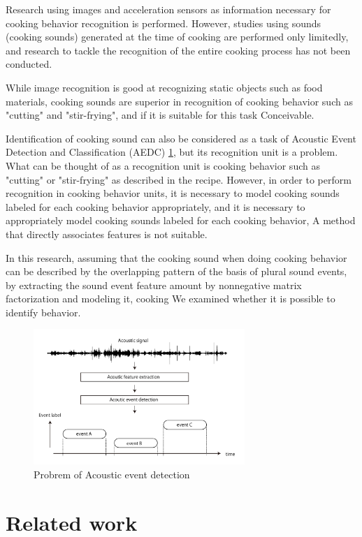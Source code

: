 \documentclass[sigchi]{acmart}
\begin{document}
Research using images and acceleration sensors as information necessary for cooking behavior recognition is performed\cite{Torre2008}\cite{Shimada2013}\cite{Kuehne2014}.
However, studies using sounds (cooking sounds) generated at the time of cooking are performed only limitedly\cite{Kojima2016}, and research to tackle the recognition of the entire cooking process has not been conducted.

While image recognition is good at recognizing static objects such as food materials, cooking sounds are superior in recognition of cooking behavior such as "cutting" and "stir-frying", and if it is suitable for this task Conceivable.

Identification of cooking sound can also be considered as a task of Acoustic Event Detection and Classification (AEDC) \ref{aed}, but its recognition unit is a problem.
What can be thought of as a recognition unit is cooking behavior such as "cutting" or "stir-frying" as described in the recipe. However, in order to perform recognition in cooking behavior units, it is necessary to model cooking sounds labeled for each cooking behavior appropriately, and it is necessary to appropriately model cooking sounds labeled for each cooking behavior, A method that directly associates features is not suitable\cite{Maijala2018}.

In this research, assuming that the cooking sound when doing cooking behavior can be described by the overlapping pattern of the basis of plural sound events, by extracting the sound event feature amount by nonnegative matrix factorization and modeling it, cooking We examined whether it is possible to identify behavior.

\begin{figure}[h]
  \centering
  \includegraphics[width=8cm]{fig/aed_fig.pdf}
  \caption{Probrem of Acoustic event detection}
  \Description{}
  \label{aed}
\end{figure}

\section{Related work}
\end{document}
